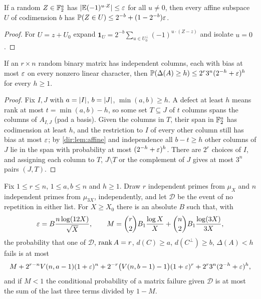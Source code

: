 \begin{lemma}\label{dir:lem:affine}
If a random $Z\in\mathbb{F}_2^a$ has $\lvert\mathbb{E}(-1)^{u\cdot Z}\rvert\le\varepsilon$ for all $u\ne0$, then every affine subspace $U$ of
codimension $b$ has $\mathbb{P}(Z\in U)\le2^{-b}+(1-2^{-b})\varepsilon$.
\end{lemma}

\begin{proof}
For $U=z+U_0$ expand $\mathbf 1_U=2^{-b}\sum_{u\in U_0^\perp}(-1)^{u\cdot(Z-z)}$ and isolate $u=0$.
\end{proof}

\begin{lemma}\label{dir:lem:rectangle}
If an $r\times n$ random binary matrix has independent columns, each with bias at most $\varepsilon$ on every nonzero
linear character, then $\mathbb{P}(\Delta(A)\ge h)\le2^r3^n(2^{-h}+\varepsilon)^h$ for every $h\ge1$.
\end{lemma}

\begin{proof}
Fix $I,J$ with $a=\lvert I\rvert$, $b=\lvert J\rvert$, $\min(a,b)\ge h$. A defect at least $h$ means rank at most
$t=\min(a,b)-h$, so some set $T\subseteq J$ of $t$ columns spans the columns of $A_{I,J}$ (pad a basis). Given the
columns in $T$, their span in $\mathbb{F}_2^a$ has codimension at least $h$, and the restriction to $I$ of every other
column still has bias at most $\varepsilon$; by \cref{dir:lem:affine} and independence all $b-t\ge h$ other columns of
$J$ lie in the span with probability at most $(2^{-h}+\varepsilon)^h$. There are $2^r$ choices of $I$, and assigning
each column to $T$, $J\setminus T$ or the complement of $J$ gives at most $3^n$ pairs $(J,T)$.
\end{proof}

\begin{proposition}\label{dir:prop:legendrefinite}
Fix $1\le r\le n$, $1\le a,b\le n$ and $h\ge1$. Draw $r$ independent primes from $\mu_X$ and $n$ independent
primes from $\mu_{3X}$, independently, and let $\mathcal D$ be the event of no repetition in either list. For
$X\ge X_0$ there is an absolute $B$ such that, with
\[
 \varepsilon=B\frac{n\log(12X)}{\sqrt X},\qquad M=\binom r2B_1\frac{\log X}X+\binom n2B_1\frac{\log(3X)}{3X},
\]
the probability that one of $\mathcal D$, $\operatorname{rank} A=r$, $d(C)\ge a$, $d(C^\perp)\ge b$, $\Delta(A)<h$ fails is at most
\[
 M+2^{r-n}V(n,a-1)(1+\varepsilon)^n+2^{-r}\bigl(V(n,b-1)-1\bigr)(1+\varepsilon)^r+2^r3^n(2^{-h}+\varepsilon)^h,
\]
and if $M<1$ the conditional probability of a matrix failure given $\mathcal D$ is at most the sum of the last three
terms divided by $1-M$.
\end{proposition}

